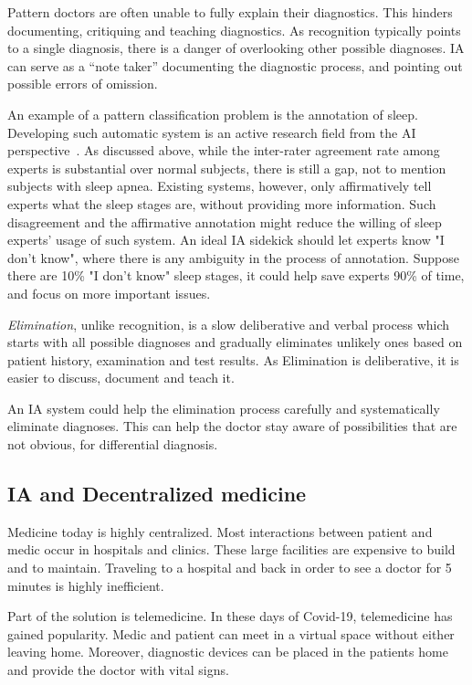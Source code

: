 \documentclass[11pt]{pnas-new}
\begin{document}
Pattern doctors are often unable to fully explain their diagnostics.
This hinders documenting, critiquing and teaching diagnostics. As
recognition typically points to a single diagnosis, there is a danger
of overlooking other possible diagnoses. IA can serve as a ``note
taker'' documenting the diagnostic process, and pointing out possible
errors of omission. 

An example of a pattern classification problem is the annotation of
sleep. Developing such automatic system is an
active research field from the AI perspective~\cite{?}. As discussed above,
while the inter-rater agreement rate among experts is substantial over
normal subjects, there is still a gap, not to mention subjects with
sleep apnea. Existing systems, however, only affirmatively tell
experts what the sleep stages are, without providing more
information. Such disagreement and the affirmative annotation might
reduce the willing of sleep experts' usage of such system. An ideal IA
sidekick should let experts know "I don't know", where there is any
ambiguity in the process of annotation. Suppose there are 10\% "I
don't know" sleep stages, it could help save experts 90\% of time, and
focus on more important issues.

{\em Elimination}, unlike recognition, is a slow deliberative and
verbal process which starts with all possible diagnoses and gradually
eliminates unlikely ones based on patient history, examination and
test results. As Elimination is deliberative, it is easier to discuss,
document and teach it.

An IA system could help the elimination process carefully and
systematically eliminate diagnoses. This can help the doctor stay
aware of possibilities that are not obvious, for differential
diagnosis.


\subsection{IA and Decentralized medicine}

Medicine today is highly centralized. Most interactions
between patient and medic occur in hospitals and clinics. These
large facilities are expensive to build and to maintain. Traveling to
a hospital and back in order to see a doctor for 5 minutes is highly
inefficient. 

Part of the solution is telemedicine. In these days of Covid-19,
telemedicine has gained popularity. Medic and patient can meet in a
virtual space without either leaving home. Moreover, diagnostic
devices can be placed in the patients home and provide the doctor with
vital signs.
\end{document}
